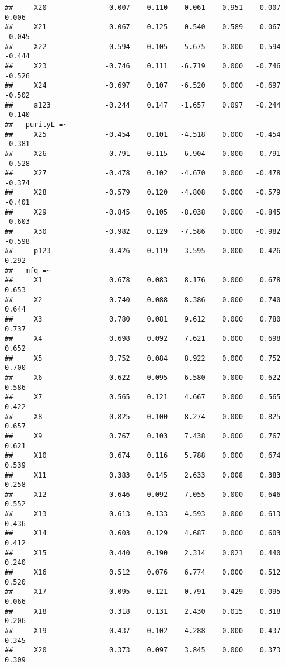 \documentclass[english,man]{apa6}
\theoremstyle{definition}
\theoremstyle{definition}
\theoremstyle{definition}
\theoremstyle{remark}
\begin{document}
\begin{verbatim}
##     X20               0.007    0.110    0.061    0.951    0.007    0.006
##     X21              -0.067    0.125   -0.540    0.589   -0.067   -0.045
##     X22              -0.594    0.105   -5.675    0.000   -0.594   -0.444
##     X23              -0.746    0.111   -6.719    0.000   -0.746   -0.526
##     X24              -0.697    0.107   -6.520    0.000   -0.697   -0.502
##     a123             -0.244    0.147   -1.657    0.097   -0.244   -0.140
##   purityL =~                                                            
##     X25              -0.454    0.101   -4.518    0.000   -0.454   -0.381
##     X26              -0.791    0.115   -6.904    0.000   -0.791   -0.528
##     X27              -0.478    0.102   -4.670    0.000   -0.478   -0.374
##     X28              -0.579    0.120   -4.808    0.000   -0.579   -0.401
##     X29              -0.845    0.105   -8.038    0.000   -0.845   -0.603
##     X30              -0.982    0.129   -7.586    0.000   -0.982   -0.598
##     p123              0.426    0.119    3.595    0.000    0.426    0.292
##   mfq =~                                                                
##     X1                0.678    0.083    8.176    0.000    0.678    0.653
##     X2                0.740    0.088    8.386    0.000    0.740    0.644
##     X3                0.780    0.081    9.612    0.000    0.780    0.737
##     X4                0.698    0.092    7.621    0.000    0.698    0.652
##     X5                0.752    0.084    8.922    0.000    0.752    0.700
##     X6                0.622    0.095    6.580    0.000    0.622    0.586
##     X7                0.565    0.121    4.667    0.000    0.565    0.422
##     X8                0.825    0.100    8.274    0.000    0.825    0.657
##     X9                0.767    0.103    7.438    0.000    0.767    0.621
##     X10               0.674    0.116    5.788    0.000    0.674    0.539
##     X11               0.383    0.145    2.633    0.008    0.383    0.258
##     X12               0.646    0.092    7.055    0.000    0.646    0.552
##     X13               0.613    0.133    4.593    0.000    0.613    0.436
##     X14               0.603    0.129    4.687    0.000    0.603    0.412
##     X15               0.440    0.190    2.314    0.021    0.440    0.240
##     X16               0.512    0.076    6.774    0.000    0.512    0.520
##     X17               0.095    0.121    0.791    0.429    0.095    0.066
##     X18               0.318    0.131    2.430    0.015    0.318    0.206
##     X19               0.437    0.102    4.288    0.000    0.437    0.345
##     X20               0.373    0.097    3.845    0.000    0.373    0.309

\end{verbatim}
\end{document}
